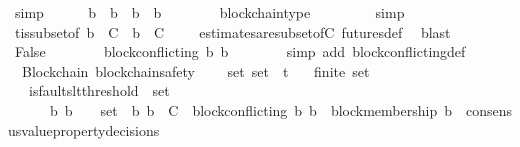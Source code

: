 \begin{isabellebody}
\ simp\isanewline
\ \ \ \ \isamarkupfalse%
\ {\isachardoublequoteopen}b{}\ {\isasymdownharpoonright}\ b{}\ {\isasymor}\ b{}\ {\isasymdownharpoonright}\ b{}{\isachardoublequoteclose}\isanewline
\ \ \ \ \ \ \isamarkupfalse%
\ blockchain{\isacharunderscore}type\ \isanewline
\ \ \ \ \ \ \isamarkupfalse%
\ {\isacharparenleft}simp{\isacharparenright}\isanewline
\ \ \ \ \ \ \isamarkupfalse%
\ {\isasymSigma}t{\isacharunderscore}is{\isacharunderscore}subset{\isacharunderscore}of{\isacharunderscore}{\isasymSigma}\ {\isacartoucheopen}b{}\ {\isasymin}\ C\ {\isasymand}\ b{}\ {\isasymin}\ C\ {\isasymand}\ {\isasymsigma}\ {\isasymin}\ {\isasymSigma}{\isacartoucheclose}\ estimates{\isacharunderscore}are{\isacharunderscore}subset{\isacharunderscore}of{\isacharunderscore}C\ futures{\isacharunderscore}def\ \isamarkupfalse%
\ blast\isanewline
\ \ \ \ \isamarkupfalse%
\ \isamarkupfalse%
\ False\isanewline
\ \ \ \ \ \ \isamarkupfalse%
\ {\isacartoucheopen}block{\isacharunderscore}conflicting\ {\isacharparenleft}b{}{\isacharcomma}\ b{}{\isacharparenright}{\isacartoucheclose}\isanewline
\ \ \ \ \ \ \isamarkupfalse%
\ {\isacharparenleft}simp\ add{\isacharcolon}\ block{\isacharunderscore}conflicting{\isacharunderscore}def{\isacharparenright}\isanewline
\ \ \isamarkupfalse%
\isanewline
{}\isamarkupfalse%
%
\endisatagproof
{\isafoldproof}%
%
\isadelimproof
\isanewline
%
\endisadelimproof
\isanewline
{}\isamarkupfalse%
\ {\isacharparenleft}\ Blockchain{\isacharparenright}\ blockchain{\isacharunderscore}safety\ {\isacharcolon}\isanewline
\ \ {\isachardoublequoteopen}{\isasymforall}\ {\isasymsigma}{\isacharunderscore}set{\isachardot}\ {\isasymsigma}{\isacharunderscore}set\ {\isasymsubseteq}\ {\isasymSigma}t\isanewline
\ \ {\isasymlongrightarrow}\ finite\ {\isasymsigma}{\isacharunderscore}set\isanewline
\ \ {\isasymlongrightarrow}\ is{\isacharunderscore}faults{\isacharunderscore}lt{\isacharunderscore}threshold\ {\isacharparenleft}{\isasymUnion}\ {\isasymsigma}{\isacharunderscore}set{\isacharparenright}\isanewline
\ \ {\isasymlongrightarrow}\ {\isacharparenleft}{\isasymforall}\ {\isasymsigma}\ {\isasymsigma}{\isacharprime}\ b{}\ b{}{\isachardot}\ {\isacharbraceleft}{\isasymsigma}{\isacharcomma}\ {\isasymsigma}{\isacharprime}{\isacharbraceright}\ {\isasymsubseteq}\ {\isasymsigma}{\isacharunderscore}set\ {\isasymand}\ {\isacharbraceleft}b{}{\isacharcomma}\ b{}{\isacharbraceright}\ {\isasymsubseteq}\ C\ {\isasymand}\ block{\isacharunderscore}conflicting\ {\isacharparenleft}b{}{\isacharcomma}\ b{}{\isacharparenright}\ {\isasymand}\ block{\isacharunderscore}membership\ b{}\ {\isasymin}\ consensus{\isacharunderscore}value{\isacharunderscore}property{\isacharunderscore}decisions\ {\isasymsigma}\ \isanewline

\end{isabellebody}

